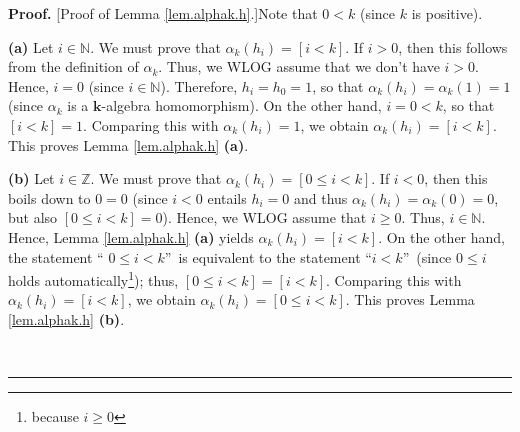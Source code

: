 \documentclass[numbers=enddot,12pt,final,onecolumn,notitlepage]{scrartcl}%
\theoremstyle{definition}
\newenvironment{proof}[1][Proof]{\noindent\textbf{#1.} }{\ \rule{0.5em}{0.5em}}
\newenvironment{vershort}{}{}
\begin{document}
\begin{proof}
[Proof of Lemma \ref{lem.alphak.h}.]Note that $0<k$ (since $k$ is positive).

\textbf{(a)} Let $i\in\mathbb{N}$. We must prove that $\alpha_{k}\left(
h_{i}\right)  =\left[  i<k\right]  $. If $i>0$, then this follows from the
definition of $\alpha_{k}$. Thus, we WLOG assume that we don't have $i>0$.
Hence, $i=0$ (since $i\in\mathbb{N}$). Therefore, $h_{i}=h_{0}=1$, so that
$\alpha_{k}\left(  h_{i}\right)  =\alpha_{k}\left(  1\right)  =1$ (since
$\alpha_{k}$ is a $\mathbf{k}$-algebra homomorphism). On the other hand,
$i=0<k$, so that $\left[  i<k\right]  =1$. Comparing this with $\alpha
_{k}\left(  h_{i}\right)  =1$, we obtain $\alpha_{k}\left(  h_{i}\right)
=\left[  i<k\right]  $. This proves Lemma \ref{lem.alphak.h} \textbf{(a)}.

\begin{vershort}
\textbf{(b)} Let $i\in\mathbb{Z}$. We must prove that $\alpha_{k}\left(
h_{i}\right)  =\left[  0\leq i<k\right]  $. If $i<0$, then this boils down to
$0=0$ (since $i<0$ entails $h_{i}=0$ and thus $\alpha_{k}\left(  h_{i}\right)
=\alpha_{k}\left(  0\right)  =0$, but also $\left[  0\leq i<k\right]  =0$).
Hence, we WLOG assume that $i\geq0$. Thus, $i\in\mathbb{N}$. Hence, Lemma
\ref{lem.alphak.h} \textbf{(a)} yields $\alpha_{k}\left(  h_{i}\right)
=\left[  i<k\right]  $. On the other hand, the statement \textquotedblleft%
$0\leq i<k$\textquotedblright\ is equivalent to the statement
\textquotedblleft$i<k$\textquotedblright\ (since $0\leq i$ holds
automatically\footnote{because $i\geq0$}); thus, $\left[  0\leq i<k\right]
=\left[  i<k\right]  $. Comparing this with $\alpha_{k}\left(  h_{i}\right)
=\left[  i<k\right]  $, we obtain $\alpha_{k}\left(  h_{i}\right)  =\left[
0\leq i<k\right]  $. This proves Lemma \ref{lem.alphak.h} \textbf{(b)}.
\end{vershort}


\end{proof}
\end{document}
